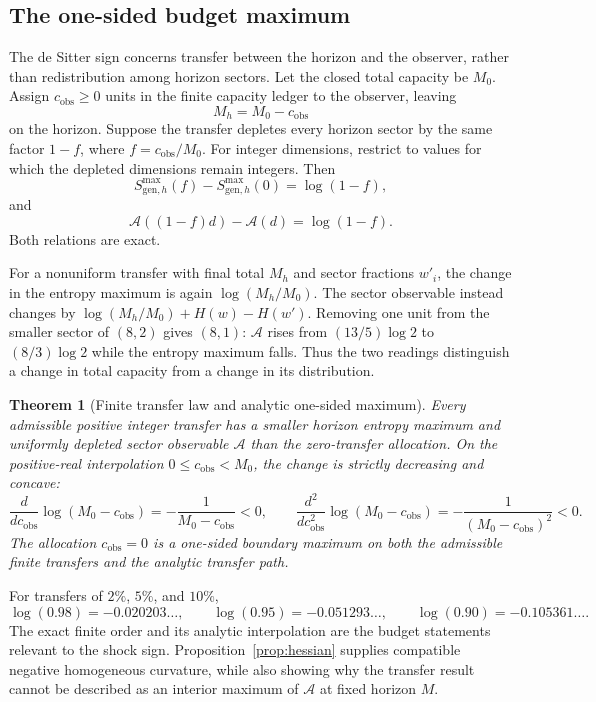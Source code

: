 \documentclass[11pt]{article}
\newtheorem{theorem}{Theorem}[section]
\theoremstyle{remark}
\begin{document}
\subsection{The one-sided budget maximum}

The de Sitter sign concerns transfer between the horizon and the observer,
rather than redistribution among horizon sectors. Let the closed total
capacity be \(M_0\). Assign \(c_{\mathrm{obs}}\geq0\) units in the finite
capacity ledger to the observer, leaving
\[
M_h=M_0-c_{\mathrm{obs}}
\]
on the horizon. Suppose the transfer depletes every horizon sector by the
same factor \(1-f\), where \(f=c_{\mathrm{obs}}/M_0\). For integer dimensions, restrict to
values for which the depleted dimensions remain integers. Then
\begin{equation}
S_{\mathrm{gen},h}^{\max}(f)-S_{\mathrm{gen},h}^{\max}(0)
=\log(1-f),
\label{eq:entropydrop}
\end{equation}
and
\begin{equation}
\mathcal A((1-f)d)-\mathcal A(d)
=\log(1-f).
\label{eq:areadrop}
\end{equation}
Both relations are exact.

For a nonuniform transfer with final total \(M_h\) and sector fractions
\(w'_i\), the change in the entropy maximum is again \(\log(M_h/M_0)\).
The sector observable instead changes by
\(\log(M_h/M_0)+H(w)-H(w')\). Removing one unit from the smaller sector
of \((8,2)\) gives \((8,1)\): \(\mathcal A\) rises from
\((13/5)\log 2\) to \((8/3)\log 2\) while the entropy maximum falls.
Thus the two readings distinguish a change in total capacity from a
change in its distribution.

\begin{theorem}[Finite transfer law and analytic one-sided maximum]
\label{thm:transfersign}
Every admissible positive integer transfer has a smaller horizon entropy
maximum and uniformly depleted sector observable \(\mathcal A\) than the zero-transfer
allocation. On the positive-real interpolation
\(0\leq c_{\mathrm{obs}}<M_0\), the change is strictly decreasing and concave:
\[
\frac{d}{dc_{\mathrm{obs}}}\log(M_0-c_{\mathrm{obs}})
=-\frac1{M_0-c_{\mathrm{obs}}}<0,
\qquad
\frac{d^2}{dc_{\mathrm{obs}}^2}\log(M_0-c_{\mathrm{obs}})
=-\frac1{(M_0-c_{\mathrm{obs}})^2}<0.
\]
The allocation \(c_{\mathrm{obs}}=0\) is a one-sided boundary maximum on both
the admissible finite transfers and the analytic transfer path.
\end{theorem}

For transfers of \(2\%\), \(5\%\), and \(10\%\),
\[
\log(0.98)=-0.020203\ldots,\qquad
\log(0.95)=-0.051293\ldots,\qquad
\log(0.90)=-0.105361\ldots.
\]
The exact finite order and its analytic interpolation are the budget statements
relevant to the shock sign. Proposition~\ref{prop:hessian} supplies compatible
negative homogeneous curvature, while also showing why the transfer result
cannot be described as an interior maximum of \(\mathcal A\) at fixed
horizon \(M\).
\end{document}
